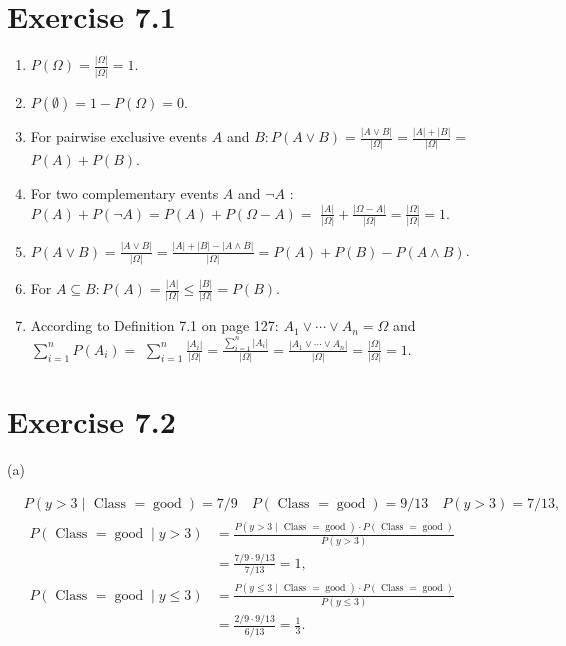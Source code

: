 \documentclass[10pt]{book}
\begin{document}
\begin{center}
\begin{enumerate}
\begin{center}
\begin{center}
\begin{center}
\begin{center}
\begin{center}
\section*{Exercise 7.1}
\begin{enumerate}
  \item $P(\Omega)=\frac{|\Omega|}{|\Omega|}=1$.
  \item $P(\emptyset)=1-P(\Omega)=0$.
  \item For pairwise exclusive events $A$ and $B: P(A \vee B)=\frac{|A \vee B|}{|\Omega|}=\frac{|A|+|B|}{|\Omega|}=$ $P(A)+P(B)$.
  \item For two complementary events $A$ and $\neg A$ : $P(A)+P(\neg A)=P(A)+P(\Omega-A)=$ $\frac{|A|}{|\Omega|}+\frac{|\Omega-A|}{|\Omega|}=\frac{|\Omega|}{|\Omega|}=1$.
  \item $P(A \vee B)=\frac{|A \vee B|}{|\Omega|}=\frac{|A|+|B|-|A \wedge B|}{|\Omega|}=P(A)+P(B)-P(A \wedge B)$.
  \item For $A \subseteq B: P(A)=\frac{|A|}{|\Omega|} \leq \frac{|B|}{|\Omega|}=P(B)$.
  \item According to Definition 7.1 on page 127: $A_{1} \vee \cdots \vee A_{n}=\Omega$ and $\sum_{i=1}^{n} P\left(A_{i}\right)=$ $\sum_{i=1}^{n} \frac{\left|A_{i}\right|}{|\Omega|}=\frac{\sum_{i=1}^{n}\left|A_{i}\right|}{|\Omega|}=\frac{\left|A_{1} \vee \cdots \vee A_{n}\right|}{|\Omega|}=\frac{|\Omega|}{|\Omega|}=1$.
\end{enumerate}


\section*{Exercise 7.2}
(a)

$$
\begin{aligned}
& P(y>3 \mid \text { Class }=\operatorname{good})=7 / 9 \quad P(\text { Class }=\operatorname{good})=9 / 13 \quad P(y>3)=7 / 13, \\
& \begin{aligned}
P(\text { Class }=\operatorname{good} \mid y>3) & =\frac{P(y>3 \mid \text { Class }=\operatorname{good}) \cdot P(\text { Class }=\operatorname{good})}{P(y>3)} \\
& =\frac{7 / 9 \cdot 9 / 13}{7 / 13}=1, \\
P(\text { Class }=\operatorname{good} \mid y \leq 3) & =\frac{P(y \leq 3 \mid \text { Class }=\operatorname{good}) \cdot P(\text { Class }=\operatorname{good})}{P(y \leq 3)} \\
& =\frac{2 / 9 \cdot 9 / 13}{6 / 13}=\frac{1}{3} .
\end{aligned}
\end{aligned}
$$


\end{center}
\end{center}
\end{center}
\end{center}
\end{center}
\end{enumerate}
\end{center}
\end{document}
